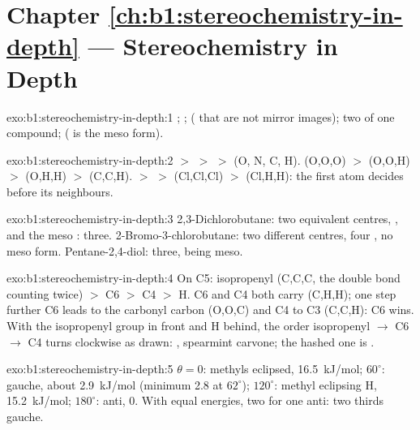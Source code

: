 \section*{Chapter \ref{ch:b1:stereochemistry-in-depth} --- Stereochemistry in Depth}

\begin{solution}{exo:b1:stereochemistry-in-depth:1}
; ;  ( that are
not mirror images); two  of one compound; 
( is the meso form).
\end{solution}

\begin{solution}{exo:b1:stereochemistry-in-depth:2}
 $>$  $>$  $>$  (O, N, C, H).
 (O,O,O) $>$  (O,O,H) $>$  (O,H,H) $>$
 (C,C,H).  $>$  $>$  (Cl,Cl,Cl)
$>$  (Cl,H,H): the first atom decides before its neighbours.
\end{solution}

\begin{solution}{exo:b1:stereochemistry-in-depth:3}
2,3-Dichlorobutane: two equivalent centres, ,  and the
meso : three. 2-Bromo-3-chlorobutane: two different centres,
four , no meso form. Pentane-2,4-diol: three, 
being meso.
\end{solution}

\begin{solution}{exo:b1:stereochemistry-in-depth:4}
On C5: isopropenyl (C,C,C, the double bond counting twice) $>$ C6 $>$ C4
$>$ H. C6 and C4 both carry (C,H,H); one step further C6 leads to the
carbonyl carbon (O,O,C) and C4 to C3 (C,C,H): C6 wins. With the isopropenyl
group in front and H behind, the order isopropenyl $\to$ C6 $\to$ C4
turns clockwise as drawn: , spearmint carvone; the hashed one is
.
\end{solution}

\begin{solution}{exo:b1:stereochemistry-in-depth:5}
$\theta = 0$: methyls eclipsed, \qty{16.5}{kJ/mol}; $60^\circ$: gauche, about
\qty{2.9}{kJ/mol} (minimum 2.8 at $62^\circ$); $120^\circ$: methyl eclipsing H,
\qty{15.2}{kJ/mol}; $180^\circ$: anti, 0. With equal energies, two  for one anti: two thirds gauche.
\end{solution}

